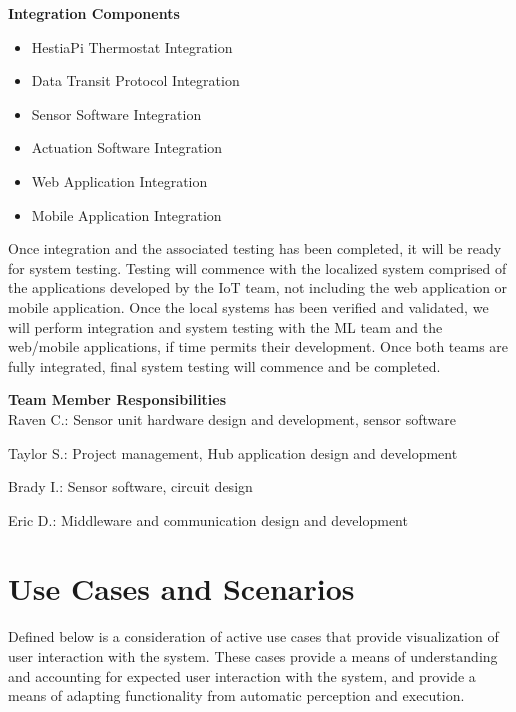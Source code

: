 \documentclass{article}
\begin{document}
\begin{flushleft}
\large
{}
\textbf{Integration Components}
\end{flushleft}
\begin{itemize}
	\item{HestiaPi Thermostat Integration}
	\item{Data Transit Protocol Integration}
	\item{Sensor Software Integration}
	\item{Actuation Software Integration}
	\item{Web Application Integration}
	\item{Mobile Application Integration}
\end{itemize}

Once integration and the associated testing has been completed, it will be ready for system testing. Testing will commence with the localized system comprised of the applications developed by the \gls{IoT} team, not including the web application or mobile application. Once the local systems has been verified and validated, we will perform integration and system testing with the ML team and the web/mobile applications, if time permits their development. Once both teams are fully integrated, final system testing will commence and be completed.
\\
\hphantom{xx}
\begin{flushleft}
\large
{}
\textbf{Team Member Responsibilities}
\small
\\
\hphantom{xx}
Raven C.: Sensor unit hardware design and development, sensor software

Taylor S.: Project management, Hub application design and development

Brady I.: Sensor software, circuit design

Eric D.: Middleware and communication design and development
\end{flushleft}
\pagebreak
\section{Use Cases and Scenarios}

Defined below is a consideration of active use cases that provide visualization of user interaction with the system. These cases provide a means of understanding and accounting for expected user interaction with the system, and provide a means of adapting functionality from automatic perception and execution.
\end{document}

